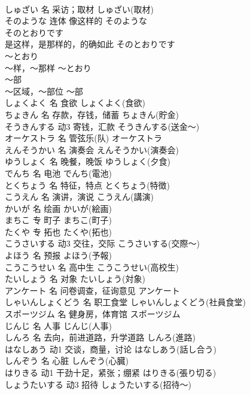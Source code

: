 \documentclass[8pt]{extreport}
\begin{document}
\begin{CJK}{UTF8}{min}
\\	しゅざい	名	采访；取材	しゅざい(取材)	
\\	そのような	连体	像这样的	そのような	
\\	そのとおりです	
\\	是这样，是那样的，的确如此	そのとおりです	
\\	～とおり	
\\	～样，～那样	～とおり	
\\	～部	
\\	～区域，～部位	～部	
\\	しょくよく	名	食欲	しょくよく(食欲)	
\\	ちょきん	名	存款，存钱，储蓄	ちょきん(貯金)	
\\	そうきんする	动3	寄钱，汇款	そうきんする(送金～)	
\\	オーケストラ	名	管弦乐(队)	オーケストラ	
\\	えんそうかい	名	演奏会	えんそうかい(演奏会)	
\\	ゆうしょく	名	晚餐，晚饭	ゆうしょく(夕食)	
\\	でんち	名	电池	でんち(電池)	
\\	とくちょう	名	特征，特点	とくちょう(特徴)	
\\	こうえん	名	演讲，演说	こうえん(講演)	
\\	かいが	名	绘画	かいが(絵画)	
\\	まちこ	专	町子	まちこ(町子)	
\\	たくや	专	拓也	たくや(拓也)	
\\	こうさいする	动3	交往，交际	こうさいする(交際～)	
\\	よほう	名	预报	よほう(予報)	
\\	こうこうせい	名	高中生	こうこうせい(高校生)	
\\	たいしょう	名	对象	たいしょう(対象)	
\\	アンケート	名	问卷调查，征询意见	アンケート	
\\	しゃいんしょくどう	名	职工食堂	しゃいんしょくどう(社員食堂)	
\\	スポーツジム	名	健身房，体育馆	スポーツジム	
\\	じんじ	名	人事	じんじ(人事)	
\\	しんろ	名	去向，前进道路，升学道路	しんろ(進路)	
\\	はなしあう	动1	交谈，商量，讨论	はなしあう(話し合う)	
\\	しんぞう	名	心脏	しんぞう(心臓)	
\\	はりきる	动1	干劲十足，紧张；绷紧	はりきる(張り切る)	
\\	しょうたいする	动3	招待	しょうたいする(招待～)	

\end{CJK}
\end{document}
